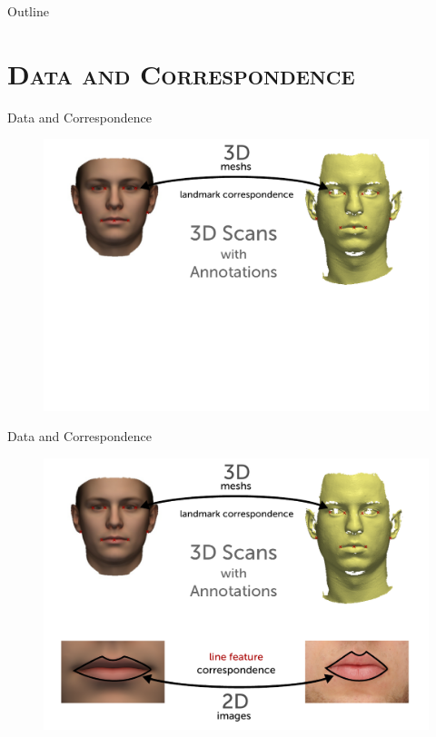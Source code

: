 \documentclass[xcolor=x11names,compress]{beamer}
\begin{document}
    \begin{frame}{Outline}
        \tableofcontents
    \end{frame}

    \section{\scshape Data and Correspondence}
    \begin{frame}{Data and Correspondence}
        \begin{figure}
            \includegraphics[width=.9\textwidth]{../resources/figures/givendata1.pdf}
        \end{figure}
    \end{frame}

    \begin{frame}{Data and Correspondence}
        \begin{figure}
            \includegraphics[width=.9\textwidth]{../resources/figures/givendata2.pdf}
        \end{figure}
    \end{frame}
\end{document}
